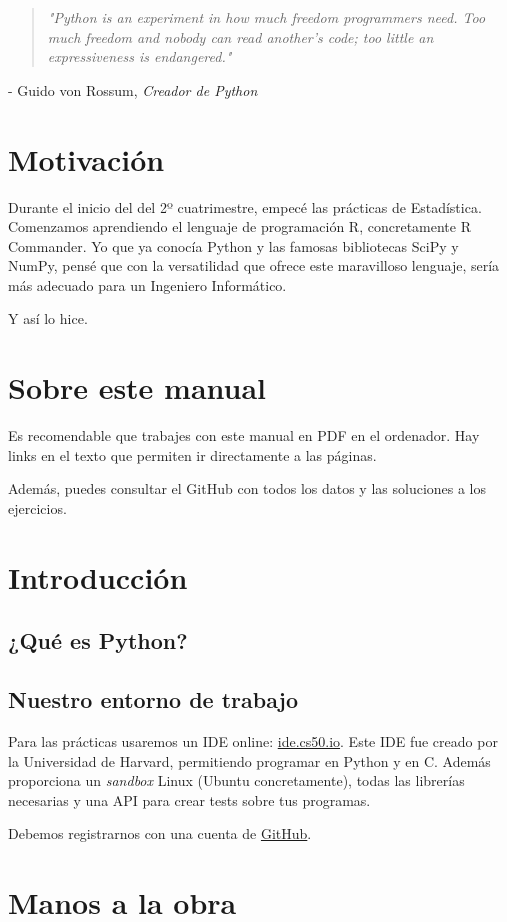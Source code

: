 \documentclass[openany,a4paper]{book}
\newcommand{\chapquote}[3]{\begin{quotation} \textit{#1} \end{quotation} \begin{flushright} - #2, \textit{#3}\end{flushright} }
\begin{document}
\newpage

\thispagestyle{empty}

\vspace*{9cm}
\chapquote{"Python is an experiment in how much freedom programmers need. Too much freedom and nobody can read another's code; too little an expressiveness is endangered."}{Guido von Rossum}{Creador de Python}


\chapter*{Motivación}

\thispagestyle{empty}

Durante el inicio del del 2º cuatrimestre, empecé las prácticas de Estadística. Comenzamos aprendiendo el lenguaje de programación R, concretamente R Commander. Yo que ya conocía Python y las famosas bibliotecas SciPy y NumPy, pensé que con la versatilidad que ofrece este maravilloso lenguaje, sería más adecuado para un Ingeniero Informático.

Y así lo hice.

\chapter*{Sobre este manual}

\thispagestyle{empty}

Es recomendable que trabajes con este manual en PDF en el ordenador. Hay links en el texto que permiten ir directamente a las páginas. 

Además, puedes consultar el GitHub con todos los datos y las soluciones a los ejercicios.

\tableofcontents

\newpage


\chapter{Introducción}

\setcounter{page}{1}

\section{¿Qué es Python?}

\section{Nuestro entorno de trabajo}

Para las prácticas usaremos un IDE online: \href{https:\\ide.cs50.io}{ide.cs50.io}. Este IDE fue creado por la Universidad de Harvard, permitiendo programar en Python y en C.
Además proporciona un \textit{sandbox} Linux (Ubuntu concretamente), todas las librerías necesarias y una API para crear tests sobre tus programas.

Debemos registrarnos con una cuenta de \href{https://github.com/}{GitHub}.





\chapter{Manos a la obra}
\end{document}
